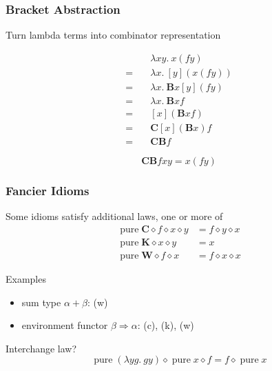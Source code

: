 \documentclass{beamer}
\DeclareMathOperator{\pure}{pure}
\newcommand{\ap}{\diamond}
\begin{document}
\begin{frame}
\frametitle{Bracket Abstraction}

Turn lambda terms into combinator representation

\begin{align*}
\quad& \lambda x y.\> x (f y) \\
=\quad& \lambda x.\> [y](x (f y)) \\
=\quad& \lambda x.\> \mathbf{B} x [y](f y) \\
=\quad& \lambda x.\> \mathbf{B} x f \\
=\quad& [x](\mathbf{B} x f) \\
=\quad& \mathbf{C} [x](\mathbf{B} x) f \\
=\quad& \mathbf{C B} f
\end{align*}

\[ \mathbf{C B} f x y = x (f y) \]
\end{frame}

\begin{frame}
\frametitle{Fancier Idioms}

Some idioms satisfy additional laws, one or more of
\begin{align*}
\pure \mathbf{C} \ap f \ap x \ap y &= f \ap y \ap x \tag{c}\\
\pure \mathbf{K} \ap x \ap y &= x \tag{k}\\
\pure \mathbf{W} \ap f \ap x &= f \ap x \ap x \tag{w}
\end{align*}

Examples
\begin{itemize}
\item sum type $\alpha + \beta$: (w)
\item environment functor $\beta \Rightarrow \alpha$: (c), (k), (w)
\end{itemize}

\vspace{5mm}
Interchange law?
\[ \pure{(\lambda y g.\>g y)} \ap \pure x \ap f = f \ap \pure x \]
\end{frame}
\end{document}

